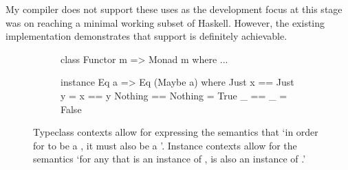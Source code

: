\documentclass[dissertation.tex]{subfiles}
\begin{document}
{{{            My compiler does not support these uses as the development focus at this stage was on reaching a minimal working subset of Haskell. However, the existing implementation demonstrates that support is definitely achievable.

            \begin{figure}[h]
            \centering
            \begin{subfigure}[t]{0.40\textwidth}
            \begin{haskellfigure}
            class Functor m => Monad m where
                ...
            \end{haskellfigure}
            \end{subfigure}
            \hspace{5mm}
            \begin{subfigure}[t]{0.40\textwidth}
            \begin{haskellfigure}
            instance Eq a => Eq (Maybe a) where
                Just x == Just y = x == y
                Nothing == Nothing = True
                _ == _ = False
            \end{haskellfigure}
            \end{subfigure}
            \caption{Typeclass contexts allow for expressing the semantics that `in order for  to be a , it must also be a '. Instance contexts allow for the semantics `for any  that is an instance of ,  is also an instance of .'}
            \label{fig:instance-context}
            \end{figure}
        }
    }
}
\end{document}
